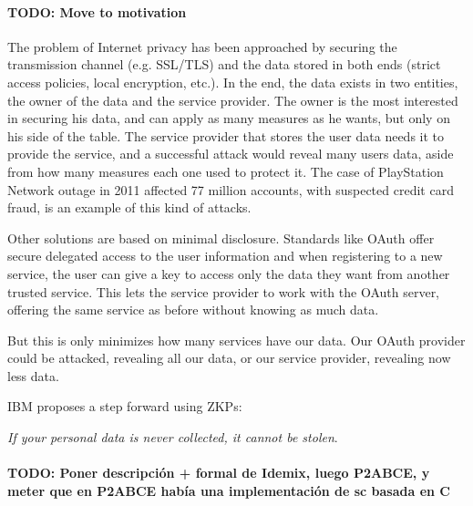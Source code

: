\paragraph{TODO: Move to motivation}

The problem of Internet privacy has been approached by securing the transmission channel (e.g. SSL/TLS) and the data stored in both ends (strict access policies, local encryption, etc.). In the end, the data exists in two entities, the owner of the data and the service provider. The owner is the most interested in securing his data, and can apply as many measures as he wants, but only on his side of the table. The service provider that stores the user data needs it to provide the service, and a successful attack would reveal many users data, aside from how many measures each one used to protect it. The case of PlayStation Network outage in 2011 \citep{PSN2011} affected 77 million accounts, with suspected credit card fraud, is an example of this kind of attacks.

\hfil


Other solutions are based on minimal disclosure. Standards like OAuth offer secure delegated access to the user information and when registering to a new service, the user can give a key to access only the data they want from another trusted service. This lets the service provider to work with the OAuth server, offering the same service as before without knowing as much data.

But this is only minimizes how many services have our data. Our OAuth provider could be attacked, revealing all our data, or our service provider, revealing now less data.

\hfill

IBM proposes a step forward using \aclp{ZKP}:


\begin{center}
	\textit{If your personal data is never collected, it cannot be stolen}.
\end{center}

\paragraph{TODO: Poner descripción + formal de Idemix, luego P2ABCE, y meter que en P2ABCE había una implementación de sc basada en C}



